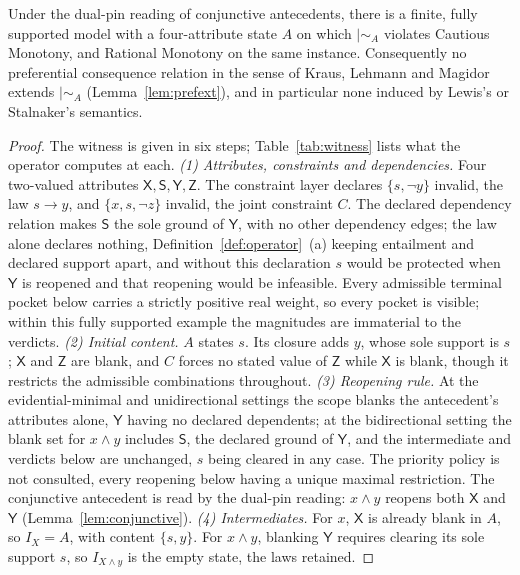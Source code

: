 \begin{theorem}\label{thm:nonpref} Under the dual-pin reading of conjunctive antecedents, there is a finite, fully supported model with a four-attribute state $A$ on which $\mid\sim_A$ violates Cautious Monotony, and Rational Monotony on the same instance. Consequently no preferential consequence relation in the sense of Kraus, Lehmann and Magidor extends $\mid\sim_A$ (Lemma~\ref{lem:prefext}), and in particular none induced by Lewis's or Stalnaker's semantics.
\end{theorem}
\begin{proof}
The witness is given in six steps; Table~\ref{tab:witness} lists what the operator computes at each.
\emph{(1) Attributes, constraints and dependencies.} Four two-valued attributes $\mathsf{X}, \mathsf{S}, \mathsf{Y}, \mathsf{Z}$. The constraint layer declares $\{s, \neg y\}$ invalid, the law $s \rightarrow y$, and $\{x, s, \neg z\}$ invalid, the joint constraint $C$. The declared dependency relation makes $\mathsf{S}$ the sole ground of $\mathsf{Y}$, with no other dependency edges; the law alone declares nothing, Definition~\ref{def:operator}~(a) keeping entailment and declared support apart, and without this declaration $s$ would be protected when $\mathsf{Y}$ is reopened and that reopening would be infeasible. Every admissible terminal pocket below carries a strictly positive real weight, so every pocket is visible; within this fully supported example the magnitudes are immaterial to the verdicts.
\emph{(2) Initial content.} $A$ states $s$. Its closure adds $y$, whose sole support is $s$; $\mathsf{X}$ and $\mathsf{Z}$ are blank, and $C$ forces no stated value of $\mathsf{Z}$ while $\mathsf{X}$ is blank, though it restricts the admissible combinations throughout.
\emph{(3) Reopening rule.} At the evidential-minimal and unidirectional settings the scope blanks the antecedent's attributes alone, $\mathsf{Y}$ having no declared dependents; at the bidirectional setting the blank set for $x \wedge y$ includes $\mathsf{S}$, the declared ground of $\mathsf{Y}$, and the intermediate and verdicts below are unchanged, $s$ being cleared in any case. The priority policy is not consulted, every reopening below having a unique maximal restriction. The conjunctive antecedent is read by the dual-pin reading: $x \wedge y$ reopens both $\mathsf{X}$ and $\mathsf{Y}$ (Lemma~\ref{lem:conjunctive}).
\emph{(4) Intermediates.} For $x$, $\mathsf{X}$ is already blank in $A$, so $I_X = A$, with content $\{s, y\}$. For $x \wedge y$, blanking $\mathsf{Y}$ requires clearing its sole support $s$, so $I_{X \wedge y}$ is the empty state, the laws retained.

\end{proof}
